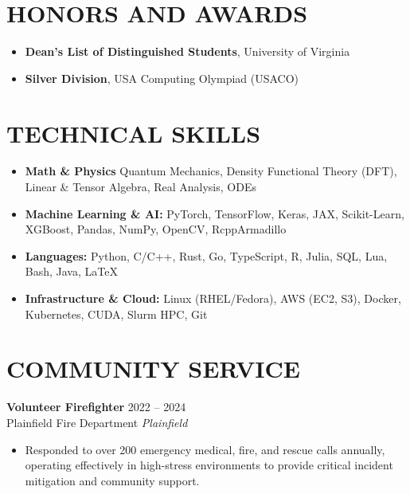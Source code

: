 \documentclass[11pt, letterpaper]{article}
\newenvironment{cvitemize}{
    \begin{itemize}[leftmargin=0.2in, label={\textbullet}, itemsep=4pt, parsep=0pt, topsep=4pt]
}{
    \end{itemize}
}
\newcommand{\cvheading}[4]{
    \vspace{4pt}
    \noindent\textbf{#1} \hfill #2 \\
    #3 \hfill \textit{#4} \vspace{2pt}
}
\begin{document}
\section{HONORS AND AWARDS}
\begin{cvitemize}
    \item \textbf{Dean's List of Distinguished Students}, University of Virginia
    \item \textbf{Silver Division}, USA Computing Olympiad (USACO)
\end{cvitemize}

\section{TECHNICAL SKILLS}
\begin{cvitemize}
    \item \textbf{Math \& Physics} Quantum Mechanics, Density Functional Theory (DFT), Linear \& Tensor Algebra, Real Analysis, ODEs
    \item \textbf{Machine Learning \& AI:} PyTorch, TensorFlow, Keras, JAX, Scikit-Learn, XGBoost, Pandas, NumPy, OpenCV, RcppArmadillo
    \item \textbf{Languages:} Python, C/C++, Rust, Go, TypeScript, R, Julia, SQL, Lua, Bash, Java, \LaTeX
    \item \textbf{Infrastructure \& Cloud:} Linux (RHEL/Fedora), AWS (EC2, S3), Docker, Kubernetes, CUDA, Slurm HPC, Git
\end{cvitemize}

\section{COMMUNITY SERVICE}
\cvheading{Volunteer Firefighter}{2022 -- 2024}{Plainfield Fire Department}{Plainfield}
\begin{cvitemize}
    \item Responded to over 200 emergency medical, fire, and rescue calls annually, operating effectively in high-stress environments to provide critical incident mitigation and community support.
\end{cvitemize}
\end{document}
